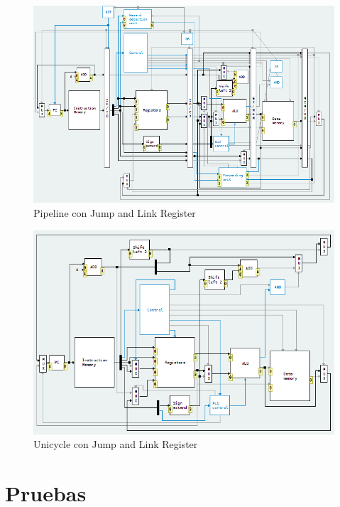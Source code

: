 \documentclass[11pt,a4paper, spanish]{article}
\begin{document}
\begin{figure}
\begin{center}
\includegraphics[width=\textwidth,height=\textheight,keepaspectratio]{img/pipeline_jalr.png}
\caption{Pipeline con Jump and Link Register}
\end{center}
\end{figure}

\begin{figure}
\begin{center}
\includegraphics[width=\textwidth,height=\textheight,keepaspectratio]{img/unicycle_jalr.png}
\caption{Unicycle con Jump and Link Register}
\end{center}
\end{figure}

\section{Pruebas}
\end{document}
